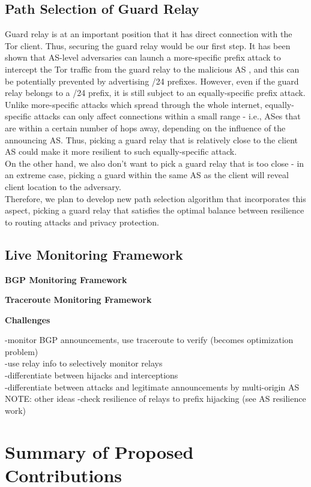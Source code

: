 \documentclass{acm_proc_article-sp}
\begin{document}
\subsection{Path Selection of Guard Relay}
Guard relay is at an important position that it has direct connection with the Tor client. Thus, securing the guard relay would be our first step. It has been shown that AS-level adversaries can launch a more-specific prefix attack to intercept the Tor traffic from the guard relay to the malicious AS \cite{sun2015raptor}, and this can be potentially prevented by advertising /24 prefixes. However, even if the guard relay belongs to a /24 prefix, it is still subject to an equally-specific prefix attack. Unlike more-specific attacks which spread through the whole internet, equally-specific attacks can only affect connections within a small range - i.e., ASes that are within a certain number of hops away, depending on the influence of the announcing AS. Thus, picking a guard relay that is relatively close to the client AS could make it more resilient to such equally-specific attack. \\
On the other hand, we also don't want to pick a guard relay that is too close - in an extreme case, picking a guard within the same AS as the client will reveal client location to the adversary. \\
Therefore, we plan to develop new path selection algorithm that incorporates this aspect, picking a guard relay that satisfies the optimal balance between resilience to routing attacks and privacy protection. 

\subsection{Live Monitoring Framework}
{\bf BGP Monitoring Framework}

{\bf Traceroute Monitoring Framework}

{\bf Challenges}

-monitor BGP announcements, use traceroute to verify (becomes optimization problem)\\
-use relay info to selectively monitor relays\\
-differentiate between hijacks and interceptions\\
-differentiate between attacks and legitimate announcements by multi-origin AS\\

NOTE: other ideas
-check resilience of relays to prefix hijacking (see AS resilience work)

\section{Summary of Proposed Contributions}

{\footnotesize 
}

\end{document}
